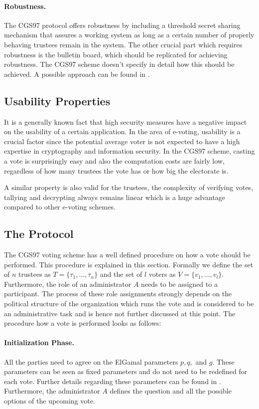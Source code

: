 \documentclass[numbers=noenddot, abstract=on, a4paper, headsepline,
footsepline, oneside, draft=off]{scrreprt}
\begin{document}
\paragraph{Robustness.} The CGS97 protocol offers robustness by including a
threshold secret sharing mechanism that assures a working system as long as a
certain number of properly behaving trustees remain in the system. The other
crucial part which requires robustness is the bulletin board, which should be
replicated for achieving robustness. The CGS97 scheme doesn't specify in detail
how this should be achieved. A possible approach can be found in \cite{HL09}.

\subsection{Usability Properties}
\label{sec:usabilityproperties}
It is a generally known fact that high security measures have a negative impact
on the usability of a certain application. In the area of e-voting, usability is a
crucial factor since the potential average voter is not expected to have a high
expertise in cryptography and information security. In the CGS97 scheme, casting
a vote is surprisingly easy and also the computation costs are fairly low,
regardless of how many trustees the vote has or how big the electorate is.

A similar property is also valid for the trustees, the complexity of verifying
votes, tallying and decrypting always remains linear which is a huge advantage
compared to other e-voting schemes.

\subsection{The Protocol}
The CGS97 voting scheme has a well defined procedure on how a vote should be
performed. This procedure is explained in this section. Formally we define the set
of $n$ trustees as $T=\{\tau_1, \ldots, \tau_n\}$ and the set of $l$
voters as $V=\{v_1, \ldots, v_l\}$. Furthermore, the role of an
administrator $A$ needs to be assigned to a participant. The process of these role assignments
strongly depends on the political structure of the organization which runs
the vote and is considered to be an administrative task and is hence not
further discussed at this point. The procedure how a vote is performed looks as
follows:

\paragraph{Initialization Phase.}
All the parties need to agree on the ElGamal parameters $p, q,$ and $g$. These
parameters can be seen as fixed parameters and do not need to be redefined for
each vote. Further details regarding these parameters can be found in
. Furthermore, the administrator $A$ defines the question and
all the possible options of the upcoming vote.
\end{document}
